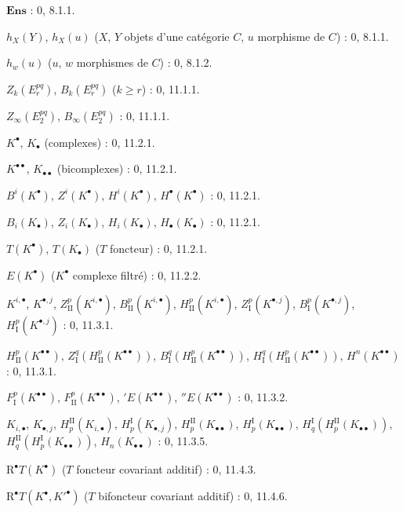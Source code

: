 \begin{flushleft}
$\mathbf{Ens}$ : 0, 8.1.1.

$h_X(Y)$, $h_X(u)$ ($X$, $Y$ objets d'une catégorie $C$, $u$ morphisme de
$C$) : 0, 8.1.1.

$h_w(u)$ ($u$, $w$ morphismes de $C$) : 0, 8.1.2.

$Z_k(E_r^{pq})$, $B_k(E_r^{pq})$ ($k\geq r$) : 0, 11.1.1.

$Z_\infty(E_2^{pq})$, $B_\infty(E_2^{pq})$ : 0, 11.1.1.

$K^\bullet$, $K_\bullet$ (complexes) : 0, 11.2.1.

$K^{\bullet\bullet}$, $K_{\bullet\bullet}$ (bicomplexes) : 0, 11.2.1.

$B^i(K^\bullet)$, $Z^i(K^\bullet)$, $H^i(K^\bullet)$,
$H^\bullet(K^\bullet)$ : 0, 11.2.1.

$B_i(K_\bullet)$, $Z_i(K_\bullet)$, $H_i(K_\bullet)$,
$H_\bullet(K_\bullet)$ : 0, 11.2.1.

$T(K^\bullet)$, $T(K_\bullet)$ ($T$ foncteur) : 0, 11.2.1.

$E(K^\bullet)$ ($K^\bullet$ complexe filtré) : 0, 11.2.2.

$K^{i,\bullet}$, $K^{\bullet,j}$, $Z_{\mathrm{II}}^p(K^{i,\bullet})$,
$B_{\mathrm{II}}^p(K^{i,\bullet})$, $H_{\mathrm{II}}^p(K^{i,\bullet})$,
$Z_{\mathrm I}^p(K^{\bullet,j})$, $B_{\mathrm I}^p(K^{\bullet,j})$,
$H_{\mathrm I}^p(K^{\bullet,j})$ : 0, 11.3.1.

$H_{\mathrm{II}}^p(K^{\bullet\bullet})$,
$Z_{\mathrm I}^q(H_{\mathrm{II}}^p(K^{\bullet\bullet}))$,
$B_{\mathrm I}^q(H_{\mathrm{II}}^p(K^{\bullet\bullet}))$,
$H_{\mathrm I}^q(H_{\mathrm{II}}^p(K^{\bullet\bullet}))$,
$H^n(K^{\bullet\bullet})$ : 0, 11.3.1.

$F_{\mathrm I}^p(K^{\bullet\bullet})$,
$F_{\mathrm{II}}^p(K^{\bullet\bullet})$, ${}'E(K^{\bullet\bullet})$,
${}''E(K^{\bullet\bullet})$ : 0, 11.3.2.

$K_{i,\bullet}$, $K_{\bullet,j}$, $H_p^{\mathrm{II}}(K_{i,\bullet})$,
$H_p^{\mathrm I}(K_{\bullet,j})$, $H_p^{\mathrm{II}}(K_{\bullet\bullet})$,
$H_p^{\mathrm I}(K_{\bullet\bullet})$,
$H_q^{\mathrm I}(H_p^{\mathrm{II}}(K_{\bullet\bullet}))$,
$H_q^{\mathrm{II}}(H_p^{\mathrm I}(K_{\bullet\bullet}))$,
$H_n(K_{\bullet\bullet})$ : 0, 11.3.5.

$\mathrm R^\bullet T(K^\bullet)$ ($T$ foncteur covariant additif) : 0, 11.4.3.

$\mathrm R^\bullet T(K^\bullet,K'^{\bullet})$ ($T$ bifoncteur covariant
additif) : 0, 11.4.6.


\end{flushleft}
